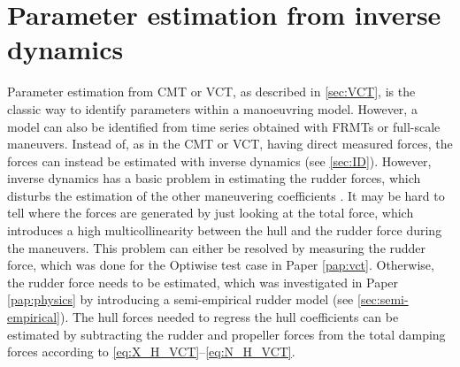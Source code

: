 \section{Parameter estimation from inverse dynamics} \label{sec:IDR}
Parameter estimation from CMT or VCT, as described in \autoref{sec:VCT}, is the classic way to identify parameters within a manoeuvring model. However, a model can also be identified from time series obtained with FRMTs or full-scale maneuvers. Instead of, as in the CMT or VCT, having direct measured forces, the forces can instead be estimated with inverse dynamics (see \autoref{sec:ID}). However, inverse dynamics has a basic problem in estimating the rudder forces, which disturbs the estimation of the other maneuvering coefficients \cite{arakiEstimatingManeuveringCoefficients2012}. It may be hard to tell where the forces are generated by just looking at the total force, which introduces a high multicollinearity between the hull and the rudder force during the maneuvers.
This problem can either be resolved by measuring the rudder force, which was done for the Optiwise test case in Paper \ref{pap:vct}. Otherwise, the rudder force needs to be estimated, which was investigated in Paper \ref{pap:physics} by introducing a semi-empirical rudder model (see \autoref{sec:semi-empirical}). The hull forces needed to regress the hull coefficients can be estimated by subtracting the rudder and propeller forces from the total damping forces according to \autoref{eq:X_H_VCT}--\autoref{eq:N_H_VCT}.



